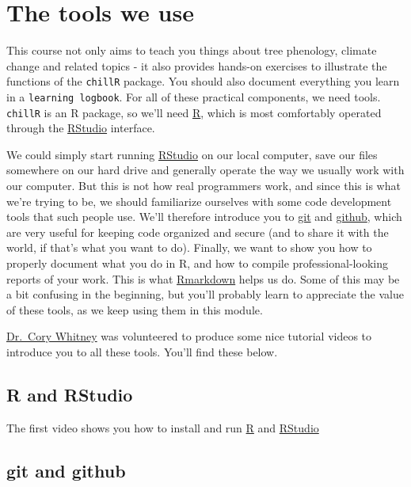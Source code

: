 \documentclass[
]{book}
\begin{document}
\hypertarget{the-tools-we-use}{%
\chapter{The tools we use}\label{the-tools-we-use}}

This course not only aims to teach you things about tree phenology, climate change and related topics - it also provides hands-on exercises to illustrate the functions of the \texttt{chillR} package. You should also document everything you learn in a \texttt{learning\ logbook}. For all of these practical components, we need tools. \texttt{chillR} is an R package, so we'll need \href{https://www.r-project.org/}{R}, which is most comfortably operated through the \href{https://rstudio.com/}{RStudio} interface.

We could simply start running \href{https://rstudio.com/}{RStudio} on our local computer, save our files somewhere on our hard drive and generally operate the way we usually work with our computer. But this is not how real programmers work, and since this is what we're trying to be, we should familiarize ourselves with some code development tools that such people use. We'll therefore introduce you to \href{https://git-scm.com/}{git} and \href{https://github.com/}{github}, which are very useful for keeping code organized and secure (and to share it with the world, if that's what you want to do). Finally, we want to show you how to properly document what you do in R, and how to compile professional-looking reports of your work. This is what \href{https://rmarkdown.rstudio.com/}{Rmarkdown} helps us do. Some of this may be a bit confusing in the beginning, but you'll probably learn to appreciate the value of these tools, as we keep using them in this module.

\href{https://www.gartenbauwissenschaft.uni-bonn.de/department/contact/cory-whitney/cory-whitney-en}{Dr.~Cory Whitney} was volunteered to produce some nice tutorial videos to introduce you to all these tools. You'll find these below.

\hypertarget{r-and-rstudio}{%
\section{R and RStudio}\label{r-and-rstudio}}

The first video shows you how to install and run \href{https://www.r-project.org/}{R} and \href{https://rstudio.com/}{RStudio}

\hypertarget{git-and-github}{%
\section{git and github}\label{git-and-github}}
\end{document}
